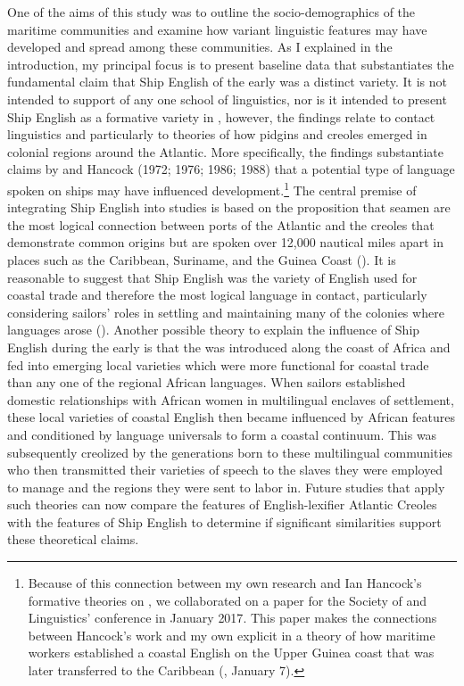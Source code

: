 One of the aims of this study was to outline the socio-demographics of the maritime communities and examine how variant linguistic features may have developed and spread among these communities. As I explained in the introduction, my principal focus is to present baseline data that substantiates the fundamental claim that Ship English of the early  was a distinct variety. It is not intended to support of any one school of  linguistics, nor is it intended to present Ship English as a formative variety in , however, the findings relate to contact linguistics and particularly to theories of how pidgins and creoles emerged in colonial regions around the Atlantic. More specifically, the findings substantiate claims by \citet{Reinecke1938} and Hancock (1972; 1976; 1986; 1988) that a potential type of language spoken on ships may have influenced  development.\footnote{Because of this connection between my own research and Ian Hancock’s formative theories on , we collaborated on a paper for the Society of  and  Linguistics’ conference in January {2017}. This paper makes the connections between Hancock’s work and my own explicit in a theory of how maritime workers established a coastal English on the Upper Guinea coast that was later transferred to the Caribbean (\citealt{DelgadoHancock2017}, January 7).} The central premise of integrating Ship English into  studies is based on the proposition that seamen are the most logical connection between ports of the Atlantic and the creoles that demonstrate common origins but are spoken over 12,000 nautical miles apart in places such as the Caribbean, Suriname, and the Guinea Coast (\citealt{Hancock1976,FaraclasEtAl2012}). It is reasonable to suggest that Ship English was the variety of English used for coastal trade and therefore the most logical language in contact, particularly considering sailors’ roles in settling and maintaining many of the colonies where  languages arose (\citealt{BaileyRoss1988,Holm1988}). Another possible theory to explain the influence of Ship English during the early  is that the  was introduced along the coast of Africa and fed into emerging local varieties which were more functional for coastal trade than any one of the regional African languages. When sailors established domestic relationships with African women in multilingual enclaves of settlement, these local varieties of coastal English then became influenced by African features and conditioned by language universals to form a coastal  continuum. This  was subsequently creolized by the generations born to these multilingual communities who then transmitted their varieties of speech to the slaves they were employed to manage and the regions they were sent to labor in. Future studies that apply such theories can now compare the features of English-lexifier Atlantic Creoles with the features of Ship English to determine if significant similarities support these theoretical claims. 

